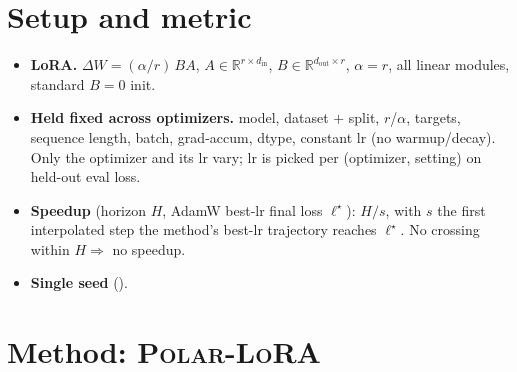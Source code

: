 \documentclass[11pt]{article}
\newcommand{\R}{\mathbb{R}}
\newcommand{\DW}{\Delta W}
\newcommand{\methodname}{\textsc{Polar-LoRA}\xspace}
\theoremstyle{plain}
\theoremstyle{definition}
\theoremstyle{remark}
\begin{document}
\section{Setup and metric}
\label{sec:setup}
\begin{itemize}[leftmargin=1.5em,itemsep=1pt,topsep=2pt]
  \item \textbf{LoRA.} $\DW=(\alpha/r)\,BA$, $A\in\R^{r\times d_{\mathrm{in}}}$, $B\in\R^{d_{\mathrm{out}}\times r}$, $\alpha{=}r$, all linear modules, standard $B{=}0$ init.
  \item \textbf{Held fixed across optimizers.} model, dataset $+$ split, $r$/$\alpha$, targets, sequence length, batch, grad-accum, dtype, constant lr (no warmup/decay). Only the optimizer and its lr vary; lr is picked per (optimizer, setting) on held-out eval loss.
  \item \textbf{Speedup} (horizon $H$, AdamW best-lr final loss $\ell^\star$): $H/s$, with $s$ the first interpolated step the method's best-lr trajectory reaches $\ell^\star$. No crossing within $H \Rightarrow$ no speedup.
  \item \textbf{Single seed} ().
\end{itemize}

\section{Method: \methodname}
\label{sec:method}

\end{document}
